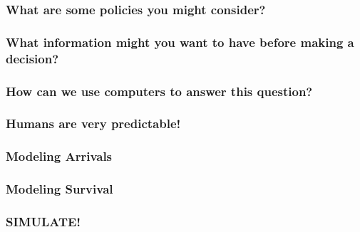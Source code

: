 \documentclass{beamer}
\begin{document}
\begin{frame}
  \frametitle{What are some policies you might consider?}
\end{frame}

\begin{frame}
  \frametitle{What information might you want to have before making a decision?}
\end{frame}

\begin{frame}
  \frametitle{How can we use computers to answer this question?}
\end{frame}

\begin{frame}
  \frametitle{Humans are very predictable!}
\end{frame}

\begin{frame}
  \frametitle{Modeling Arrivals}
\end{frame}


\begin{frame}
  \frametitle{Modeling Survival}
\end{frame}



\begin{frame}
  \frametitle{SIMULATE! }
\end{frame}
\end{document}
